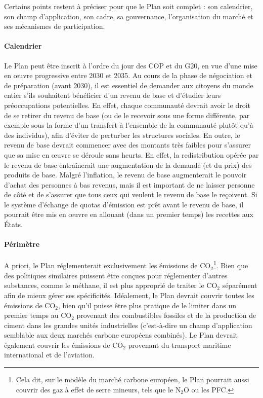 \documentclass[a5paper,french,openany]{memoir}
\begin{document}
Certains points restent à préciser pour que le Plan soit complet : son calendrier, son champ d'application, son cadre, sa gouvernance, l'organisation du marché et ses mécanismes de participation. 

\paragraph{Calendrier} 
Le Plan peut être inscrit à l'ordre du jour des COP et du G20, en vue d'une mise en œuvre progressive entre 2030 et 2035. Au cours de la phase de négociation et de préparation (avant 2030), il est essentiel de demander aux citoyens du monde entier s'ils souhaitent bénéficier d'un revenu de base et d'étudier leurs préoccupations potentielles. En effet, chaque communauté devrait avoir le droit de se retirer du revenu de base (ou de le recevoir sous une forme différente, par exemple sous la forme d'un transfert à l'ensemble de la communauté plutôt qu'à des individus), afin d'éviter de perturber les structures sociales. En outre, le revenu de base devrait commencer avec des montants très faibles pour s'assurer que sa mise en œuvre se déroule sans heurts. En effet, la redistribution opérée par le revenu de base entraînerait une augmentation de la demande (et du prix) des produits de base. Malgré l'inflation, le revenu de base augmenterait le pouvoir d'achat des personnes à bas revenus, mais il est important de ne laisser personne de côté et de s'assurer que tous ceux qui veulent le revenu de base le reçoivent. Si le système d'échange de quotas d'émission est prêt avant le revenu de base, il pourrait être mis en œuvre en allouant (dans un premier temps) les recettes aux États.

\paragraph{Périmètre} 
A priori, le Plan réglementerait exclusivement les émissions de CO$_\text{2}$\footnote{Cela dit, sur le modèle du marché carbone européen, le Plan pourrait aussi couvrir des gaz à effet de serre mineurs, tels que le N$_\text{2}$O ou les PFC.}. Bien que des politiques similaires puissent être conçues pour réglementer d'autres substances, comme le méthane, il est plus approprié de traiter le CO$_\text{2}$ séparément afin de mieux gérer ses spécificités. Idéalement, le Plan devrait couvrir toutes les émissions de CO$_\text{2}$, bien qu'il puisse être plus pratique de le limiter dans un premier temps au CO$_\text{2}$ provenant des combustibles fossiles et de la production de ciment dans les grandes unités industrielles (c'est-à-dire un champ d'application semblable aux deux marchés carbone européens combinés). Le Plan devrait également couvrir les émissions de CO$_\text{2}$ provenant du transport maritime international et de l'aviation. 
\end{document}
